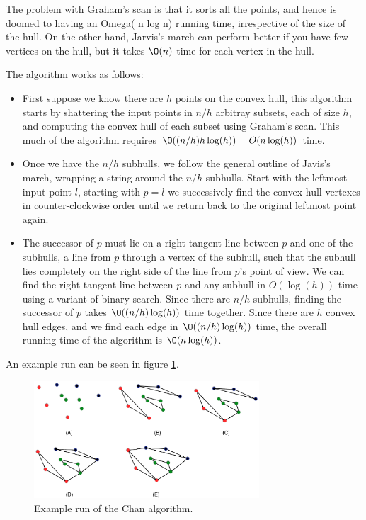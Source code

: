 \documentclass[10pt]{article}
\begin{document}
The problem with Graham's scan is that it sorts all the points, and hence is doomed to having an Omega( n log n) running time, irrespective of the size of the hull. On the other hand, Jarvis's march can perform better if you have few vertices on the hull, but it takes $\O(n)$ time for each vertex in the hull.

The algorithm works as follows: 

\begin{itemize}
  \item First suppose we know there are $h$ points on the convex hull, this algorithm starts by shattering the input points in $n/h$ arbitray subsets, each of size $h$, and computing the convex hull of each subset using Graham's scan. This much of the algorithm requires $\O((n/h)h\log(h)) = O(n\log(h))$ time.
  \item Once we have the $n/h$ subhulls, we follow the general outline of Javis's march, wrapping a string around the $n/h$ subhulls. Start with the leftmost input point $l$, starting with $p = l$ we successively find the convex hull vertexes in counter-clockwise order until we return back to the original leftmost point again.
  \item The successor of $p$ must lie on a right tangent line between $p$ and one of the subhulls, a line from $p$ through a vertex of the subhull, such that the subhull lies completely on the right side of the line from $p$'s point of view. We can find the right tangent line between $p$ and any subhull in $O(\log(h))$ time using a variant of binary search. Since there are $n/h$ subhulls, finding the successor of $p$ takes $\O((n/h)\log(h))$ time together. Since there are $h$ convex hull edges, and we find each edge in $\O((n/h)\log(h))$ time, the overall running time of the algorithm is $\O(n\log(h))$.
\end{itemize}

An example run can be seen in figure \ref{fig22}.


\begin{figure}[ht]
\centering
\includegraphics[width=0.75\textwidth]{figures/fig22.pdf}
\caption{Example run of the Chan algorithm.}
\label{fig22}
\end{figure}
\end{document}
